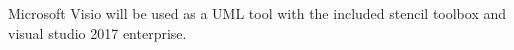 Microsoft Visio will be used as a UML tool with the included stencil toolbox and visual studio 2017 enterprise.












